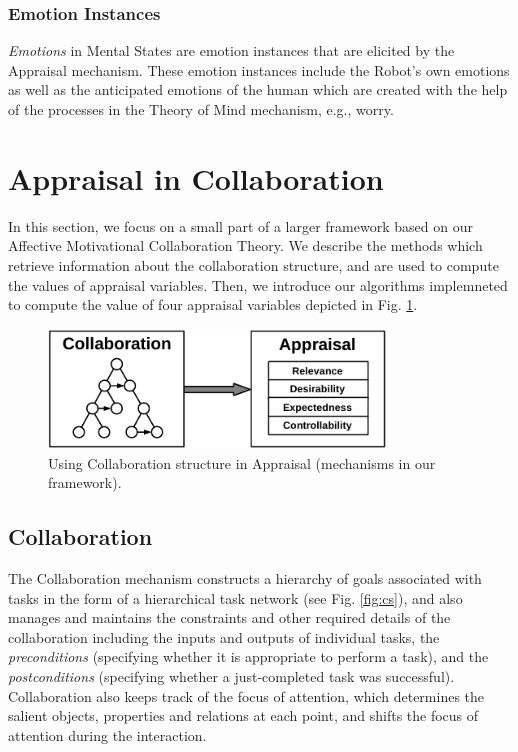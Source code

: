 \subsubsection{Emotion Instances}

\textit{Emotions} in Mental States are emotion instances that are elicited by
the Appraisal mechanism. These emotion instances include the Robot's own
emotions as well as the anticipated emotions of the human which are created with
the help of the processes in the Theory of Mind mechanism, e.g., worry.

\section{Appraisal in Collaboration}
\label{sec:appraisalCollaboraiton}

In this section, we focus on a small part of a larger framework based on our
Affective Motivational Collaboration Theory. We describe the methods which
retrieve information about the collaboration structure, and are used to compute
the values of appraisal variables. Then, we introduce our algorithms implemneted
to compute the value of four appraisal variables depicted in Fig.
\ref{fig:ActionSelection}.

\begin{figure}[tbh]
  \centering
  \includegraphics[width=0.8\textwidth]{figure/ActionSelection-croped.pdf}
  \caption{{\fontsize{9}{9}\selectfont Using Collaboration structure in
  Appraisal (mechanisms in our framework).}}
  \label{fig:ActionSelection}
\end{figure}

\subsection{Collaboration}
The Collaboration mechanism constructs a hierarchy of goals associated with
tasks in the form of a hierarchical task network (see Fig. \ref{fig:cs}), and
also manages and maintains the constraints and other required details of the
collaboration including the inputs and outputs of individual tasks, the
\textit{preconditions} (specifying whether it is appropriate to perform a task),
and the \textit{postconditions} (specifying whether a just-completed task was
successful). Collaboration also keeps track of the focus of attention, which
determines the salient objects, properties and relations at each point, and
shifts the focus of attention during the interaction.

